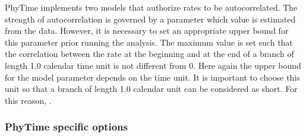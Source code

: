 \documentclass[a4paper,12pt]{article}
\begin{document}
PhyTime  implements  two  models  that  authorize  rates  to  be  autocorrelated.  The  strength  of
autocorrelation is governed  by a parameter which value  is estimated from the data.  However, it is
necessary to  set an appropriate  upper bound  for this parameter  prior running the  analysis.  The
maximum value is set such that the correlation between the rate at the beginning and at the end of a
branch of length 1.0 calendar time unit is not  different from 0. Here again the upper bound for the
model parameter depends  on the time unit. It is  important to choose this unit so  that a branch of
length 1.0 calendar unit can be considered as short. For this reason, {\color{red}{we recommend to select a time
unit so that the calibration times take values between -10 and -1000}}.

\subsubsection{PhyTime specific options}
\end{document}
